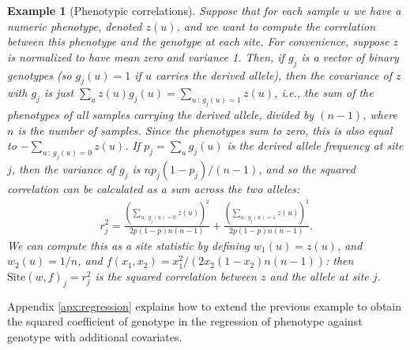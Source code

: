 \documentclass[9pt,twoside,lineno]{gsajnl}
\newcommand{\st}{\,\colon\,}
\newtheorem{example}{Example}
\newcommand{\site}{\mbox{Site}} %
\newcommand{\iw}{w} %
\begin{document}
\begin{example}[Phenotypic correlations] \label{ex:site_correlations}
    Suppose that for each sample $u$ we have a numeric phenotype, denoted $z(u)$,
    and we want to compute the correlation between this phenotype
    and the genotype at each site.
    For convenience, suppose $z$ is normalized
    to have mean zero and variance 1.
    Then, if $g_j$ is a vector of binary genotypes (so $g_j(u) = 1$ if $u$ carries the derived allele),
    then the covariance of $z$ with $g_j$ is just $\sum_u z(u) g_j(u) = \sum_{u \st g_j(u) = 1} z(u)$,
    i.e., the sum of the phenotypes of all samples carrying the derived allele,
    divided by $(n - 1)$, where $n$ is the number of samples.
    Since the phenotypes sum to zero, this is also equal to
    $- \sum_{u \st g_j(u) = 0} z(u)$.
    If $p_j = \sum_u g_j(u)$ is the derived allele frequency at site $j$,
    then the variance of $g_j$ is $n p_j (1-p_j) / (n-1)$,
    and so the squared correlation can be calculated as a sum across the two alleles:
    \begin{align*}
        r_j^2 =
        \frac{\left( \sum_{u \st g_j(u) = 0} z(u)\right)^2}{2p(1-p)n(n-1)}
        + \frac{\left( \sum_{u \st g_j(u) = 1} z(u)\right)^2}{2p(1-p)n(n-1)}  .
    \end{align*}
    We can compute this as a site statistic by defining $\iw_{1}(u) = z(u)$, and $\iw_{2}(u) = 1/n$,
    and $f(x_1, x_2) = x_1^2 / (2 x_2 (1 - x_2) n (n-1))$:
    then $\site(\iw, f)_j = r_j^2$ is the squared correlation between $z$ and the allele at site $j$.
\end{example}

Appendix \ref{apx:regression} explains how to extend the previous example
to obtain the squared coefficient of genotype in the regression of phenotype
against genotype with additional covariates.
\end{document}
